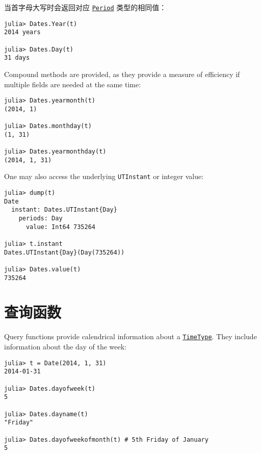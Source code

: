 当首字母大写时会返回对应 \hyperlink{17624028548543163266}{\texttt{Period}} 类型的相同值：




\begin{verbatim}
julia> Dates.Year(t)
2014 years

julia> Dates.Day(t)
31 days
\end{verbatim}



Compound methods are provided, as they provide a measure of efficiency if multiple fields are needed at the same time:




\begin{verbatim}
julia> Dates.yearmonth(t)
(2014, 1)

julia> Dates.monthday(t)
(1, 31)

julia> Dates.yearmonthday(t)
(2014, 1, 31)
\end{verbatim}



One may also access the underlying \texttt{UTInstant} or integer value:




\begin{verbatim}
julia> dump(t)
Date
  instant: Dates.UTInstant{Day}
    periods: Day
      value: Int64 735264

julia> t.instant
Dates.UTInstant{Day}(Day(735264))

julia> Dates.value(t)
735264
\end{verbatim}



\hypertarget{6547083286508545671}{}


\section{查询函数}



Query functions provide calendrical information about a \hyperlink{4438614350756187528}{\texttt{TimeType}}. They include information about the day of the week:




\begin{verbatim}
julia> t = Date(2014, 1, 31)
2014-01-31

julia> Dates.dayofweek(t)
5

julia> Dates.dayname(t)
"Friday"

julia> Dates.dayofweekofmonth(t) # 5th Friday of January
5
\end{verbatim}



